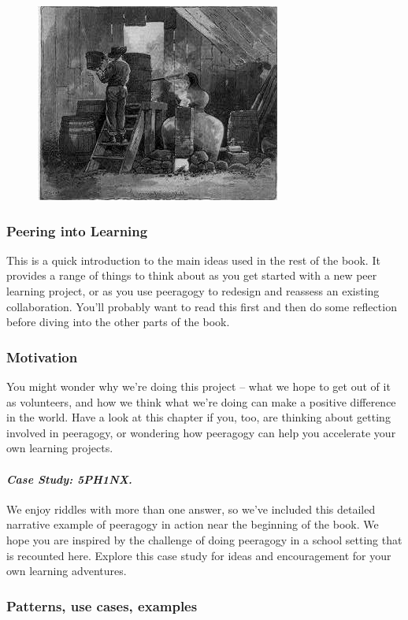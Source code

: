 \begin{figure}[htbp]
\centering
\includegraphics[width=.4\textwidth]{../pictures/moonshine.jpg}
\end{figure}

\subsubsection{Peering into Learning}

\noindent This is a quick introduction to the main ideas used in the rest of the
book. It provides a range of things to think about as you get started
with a new peer learning project, or as you use peeragogy to redesign
and reassess an existing collaboration. You'll probably want to read
this first and then do some reflection before diving into the other
parts of the book.

\subsubsection{Motivation}
\noindent You might wonder why we're doing this project -- what we hope to get
out of it as volunteers, and how we think what we're doing can make a
positive difference in the world. Have a look at this chapter if you,
too, are thinking about getting involved in peeragogy, or wondering
how peeragogy can help you accelerate your own learning projects.

\paragraph{\emph{Case Study: 5PH1NX.}}
We enjoy riddles with more than one answer, so we've included this
detailed narrative example of peeragogy in action near the beginning
of the book. We hope you are inspired by the challenge of doing
peeragogy in a school setting that is recounted here. Explore this
case study for ideas and encouragement for your own learning
adventures.

\subsubsection{Patterns, use cases, examples}

